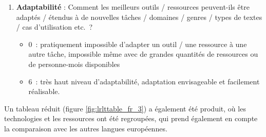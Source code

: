 \begin{french}
\begin{multicols}{2}
\begin{enumerate}
\item {\bf Adaptabilité} : Comment les meilleurs outils / ressources peuvent-ils être adaptés / étendus à de nouvelles tâches / domaines / genres / types de textes / cas d'utilisation etc.~? 
\begin{itemize}
      \item 0~: pratiquement impossible d'adapter un outil / une ressource à une autre tâche, impossible même avec de grandes quantités de ressources ou de personne-mois disponibles
      \item 6~: très haut niveau d'adaptabilité, adaptation envisageable et facilement réalisable.
      \end{itemize}
\end{enumerate}


Un tableau réduit (figure \ref{fig:lrlttable_fr_3}) a également été produit, où les technologies et les
ressources ont été regroupées, qui prend également en compte la comparaison avec les autres langues européennes.


\end{multicols}
\end{french}
